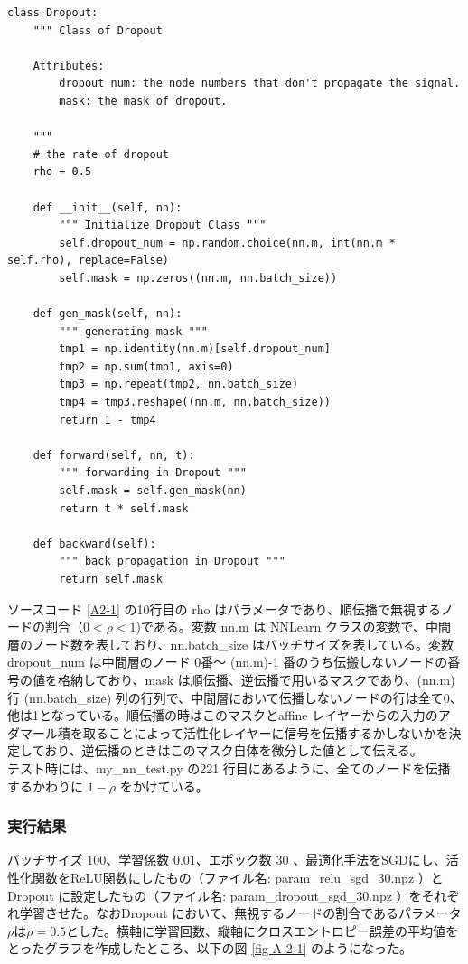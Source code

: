 \documentclass[a4paper,dvipdfmx]{jsarticle}
\begin{document}
\begin{lstlisting}[caption="クラス Dropout ",label=A2-1]
class Dropout:
    """ Class of Dropout

    Attributes:
        dropout_num: the node numbers that don't propagate the signal.
        mask: the mask of dropout.

    """
    # the rate of dropout
    rho = 0.5

    def __init__(self, nn):
        """ Initialize Dropout Class """
        self.dropout_num = np.random.choice(nn.m, int(nn.m * self.rho), replace=False)
        self.mask = np.zeros((nn.m, nn.batch_size))

    def gen_mask(self, nn):
        """ generating mask """
        tmp1 = np.identity(nn.m)[self.dropout_num]
        tmp2 = np.sum(tmp1, axis=0)
        tmp3 = np.repeat(tmp2, nn.batch_size)
        tmp4 = tmp3.reshape((nn.m, nn.batch_size))
        return 1 - tmp4

    def forward(self, nn, t):
        """ forwarding in Dropout """
        self.mask = self.gen_mask(nn)
        return t * self.mask

    def backward(self):
        """ back propagation in Dropout """
        return self.mask
\end{lstlisting}

ソースコード \ref{A2-1} の10行目の rho はパラメータであり、順伝播で無視するノードの割合（$ 0 < \rho < 1$)である。変数 nn.m は NNLearn クラスの変数で、中間層のノード数を表しており、nn.batch\_size はバッチサイズを表している。変数  dropout\_num は中間層のノード 0番〜 (nn.m)-1 番のうち伝搬しないノードの番号の値を格納しており、mask は順伝播、逆伝播で用いるマスクであり、(nn.m) 行 
 (nn.batch\_size) 列の行列で、中間層において伝播しないノードの行は全て0、他は1となっている。順伝播の時はこのマスクとaffine レイヤーからの入力のアダマール積を取ることによって活性化レイヤーに信号を伝播するかしないかを決定しており、逆伝播のときはこのマスク自体を微分した値として伝える。\\
 
 テスト時には、my\_nn\_test.py の221 行目にあるように、全てのノードを伝播するかわりに $1-\rho$ をかけている。
 
 \subsubsection*{実行結果}
 
バッチサイズ $100$、学習係数 $0.01$、エポック数 $30$ 、最適化手法をSGDにし、活性化関数をReLU関数にしたもの（ファイル名: param\_relu\_sgd\_30.npz ）とDropout に設定したもの（ファイル名: param\_dropout\_sgd\_30.npz ）をそれぞれ学習させた。なおDropout において、無視するノードの割合であるパラメータ$\rho$は$\rho = 0.5$とした。横軸に学習回数、縦軸にクロスエントロピー誤差の平均値をとったグラフを作成したところ、以下の図 \ref{fig-A-2-1} のようになった。
\end{document}
